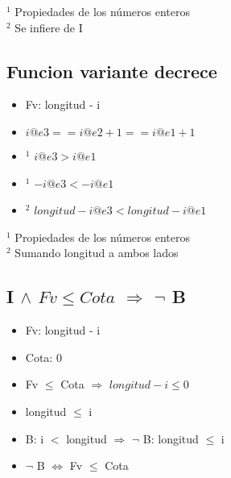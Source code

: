 \vspace{3mm}

\noindent $ ^1 $ Propiedades de los números enteros\\
$ ^2 $ Se infiere de I\\

\subsection{Funcion variante decrece}
\begin{itemize}
	\item Fv: longitud - i
	\item $ i@e3 == i@e2 + 1 == i@e1 + 1 $
	\item $ ^1 $ $ i@e3 > i@e1 $
	\item $ ^1 $ $ - i@e3 < - i@e1 $
	\item $ ^2 $ \textcolor{NavyBlue}{ $ longitud - i@e3 < longitud - i@e1 $} \checkmark	
\end{itemize}
\vspace{3mm}

\noindent $ ^1 $ Propiedades de los números enteros\\
$ ^2 $ Sumando longitud a ambos lados\\

\subsection{I $ \land $ $ Fv \leq Cota $ $ \Rightarrow $ $ \lnot $ B}
\begin{itemize}
	\item Fv: longitud - i
	\item Cota: 0
	\item Fv $ \leq $ Cota $ \Rightarrow $ $ longitud - i \leq 0 $ 
	\item longitud $ \leq $ i
	\item B: i $ < $ longitud $ \Rightarrow $ $ \lnot $ B: longitud $ \leq $ i
	\item \textcolor{NavyBlue}{ $ \lnot $ B $ \Leftrightarrow $ Fv  $ \leq $ Cota} \checkmark	
\end{itemize}
\vspace{3mm}

